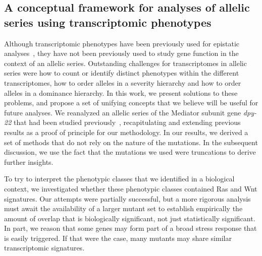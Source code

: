 \documentclass[9pt,twocolumn,twoside]{gsajnl}
\newcommand{\gene}[1]{\mbox{\emph{#1}}}
\newcommand{\dpy}[1]{\gene{dpy-22#1}}
\begin{document}
\subsection{A conceptual framework for analyses of allelic series using
transcriptomic phenotypes}
Although transcriptomic phenotypes have been previously used for epistatic
analyses~\cite{Dixit2016,AngelesAlboresHIF,Angeles-Albores2017}, they have not
been previously used to study gene function in the context of an allelic series.
Outstanding challenges for transcriptomes in allelic series were how to count or
identify distinct phenotypes within the different transcriptomes, how to order
alleles in a severity hierarchy and how to order alleles in a dominance
hierarchy. In this work, we present solutions to these problems, and propose a
set of unifying concepts that we believe will be useful for future analyses. We
reanalyzed an allelic series of the Mediator subunit gene \dpy{} that had been
studied previously~\cite{Moghal2003}, recapitulating and extending previous
results as a proof of principle for our methodology. In our results, we derived
a set of methods that do not rely on the nature of the mutations. In the
subsequent discussion, we use the fact that the mutations we used were
truncations to derive further insights.

To try to interpret the phenotypic classes that we identified in a biological
context, we investigated whether these phenotypic classes contained Ras and Wnt
signatures. Our attempts were partially successful, but a more rigorous analysis
must await the availability of a larger mutant set to establish empirically the
amount of overlap that is biologically significant, not just statistically
significant. In part, we reason that some genes may form part of a broad stress
response that is easily triggered. If that were the case, many mutants may share
similar transcriptomic signatures.
\end{document}
